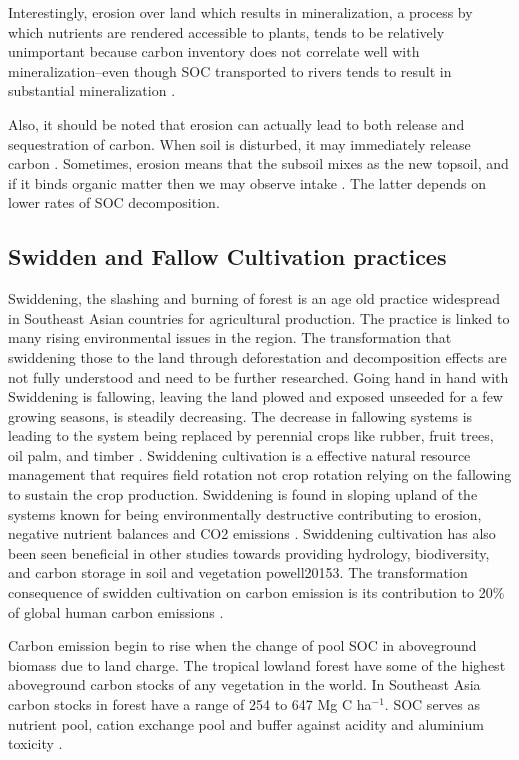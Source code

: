 Interestingly, erosion over land which results in mineralization, a process by which nutrients are rendered accessible to plants, tends to be relatively unimportant because carbon inventory does not correlate well with mineralization--even though SOC transported to rivers tends to result in substantial mineralization \citep{cole2007plumbing}. 

Also, it should be noted that erosion can actually lead to both release and sequestration of carbon. When soil is disturbed, it may immediately release carbon \citep{berhe2007significance}. Sometimes, erosion means that the subsoil mixes as the new topsoil, and if it binds organic matter then we may observe intake \citep{harden1999dynamic}. The latter depends on lower rates of SOC decomposition.

\subsection{Swidden and Fallow Cultivation practices}

Swiddening, the slashing and burning of forest is an age old practice widespread in Southeast Asian countries for agricultural production. The practice is linked to many rising environmental issues in the region. The transformation that swiddening those to the land through deforestation and decomposition effects are not fully understood and need to be further researched. Going hand in hand with Swiddening is fallowing, leaving the land plowed and exposed unseeded for a few growing seasons, is steadily decreasing. The decrease in fallowing systems is leading to the system being replaced by perennial crops like rubber, fruit trees, oil palm, and timber \citep{schmidt2009assessment}. Swiddening cultivation is a effective natural resource management that requires field rotation not crop rotation relying on the fallowing to sustain the crop production. Swiddening is found in sloping upland of the systems known for being environmentally destructive contributing to erosion, negative nutrient balances and CO2 emissions \citep{de2008soil}. Swiddening cultivation has also been seen beneficial in other studies towards providing hydrology, biodiversity, and carbon storage in soil and vegetation {powell20153}. The transformation consequence of swidden cultivation on carbon emission is its contribution to 20\% of global human carbon emissions \citep{meehl2007global}.

Carbon emission begin to rise when the change of pool SOC in aboveground biomass due to land charge. The tropical lowland forest have some of the highest aboveground carbon stocks of any vegetation in the world. In Southeast Asia carbon stocks in forest have a range of 254 to 647 Mg C ha$^{-1}$. SOC serves as nutrient pool, cation exchange pool and buffer against acidity and aluminium toxicity \citep{silver2000potential}. 


